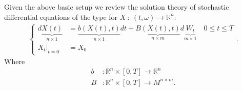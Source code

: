Given the above basic setup we review the solution theory of stochastic differential equations of the type for $X \ : \ (t,\omega ) \to  \mathbb{R}^{n} $:
 \begin{align}\label{sde}
  \begin{cases}
    d\underbrace{X(t)}_{n \times 1} &= \underbrace{b(X(t),t)}_{n \times 1} dt + \underbrace{B(X(t),t)}_{n \times m} d\underbrace{W_t}_{m \times 1} \quad 0\le t\le T \\
    X_{t}\rvert_{t=0} &= X_{0} 
  \end{cases}
 .\end{align}
 Where 
 \begin{align*}
   b &: \mathbb{R}^{n} \times [0,T] \to \mathbb{R}^{n}   \\
   B &: \mathbb{R}^{n} \times [0,T] \to  M^{n\times m}  
 .\end{align*}

